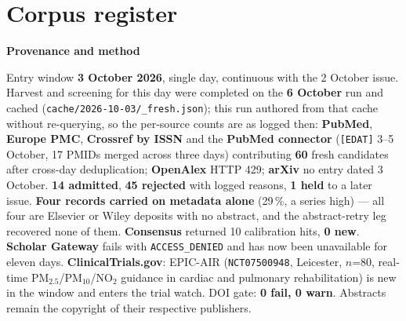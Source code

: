 \documentclass[10pt]{article}
\begin{document}
\clearpage
\section*{\sffamily\bfseries\color{Deep}Corpus register}
\vspace{-1.5mm}{\color{Amber}\rule{\linewidth}{1.1pt}}\vspace{2.5mm}



\vspace{2mm}

\begin{keybox}
{\sffamily\bfseries\footnotesize\color{Deep}Provenance and method}\\[1.2mm]
{\fontsize{7.2}{8.8}\selectfont
Entry window \textbf{3 October 2026}, single day, continuous with the 2 October issue. Harvest and
screening for this day were completed on the \textbf{6 October} run and cached
(\texttt{cache/2026-10-03/\_fresh.json}); this run authored from that cache without re-querying, so the
per-source counts are as logged then: \textbf{PubMed}, \textbf{Europe PMC}, \textbf{Crossref by ISSN} and
the \textbf{PubMed connector} (\texttt{[EDAT]} 3--5 October, 17 PMIDs merged across three days) contributing
\textbf{60} fresh candidates after cross-day deduplication; \textbf{OpenAlex} HTTP 429; \textbf{arXiv} no
entry dated 3 October. \textbf{14 admitted}, \textbf{45 rejected} with logged reasons, \textbf{1 held} to a
later issue. \textbf{Four records carried on metadata alone} (29\,\%, a series high) --- all four are
Elsevier or Wiley deposits with no abstract, and the abstract-retry leg recovered none of them.
\textbf{Consensus} returned 10 calibration hits, \textbf{0 new}. \textbf{Scholar Gateway} fails with
\texttt{ACCESS\_DENIED} and has now been unavailable for eleven days. \textbf{ClinicalTrials.gov}:
EPIC-AIR (\texttt{NCT07500948}, Leicester, $n$=80, real-time PM$_{2.5}$/PM$_{10}$/NO$_2$ guidance in cardiac
and pulmonary rehabilitation) is new in the window and enters the trial watch. DOI gate: \textbf{0 fail,
0 warn}. Abstracts remain the copyright of their respective publishers.\par}
\end{keybox}
\end{document}
